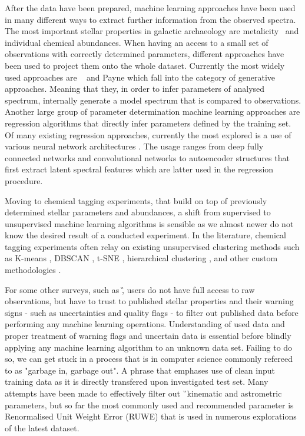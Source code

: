 After the data have been prepared, machine learning approaches have been used in many different ways to extract further information from the observed spectra. The most important stellar properties in galactic archaeology are metalicity \Feh\ and individual chemical abundances. When having an access to a small set of observations with correctly determined parameters, different approaches have been used to project them onto the whole dataset. Currently the most widely used approaches are \TC\ \cite{2015ApJ...808...16N, buder2018} and Payne \citep{2019ApJ...879...69T} which fall into the category of generative approaches. Meaning that they, in order to infer parameters of analysed spectrum, internally generate a model spectrum that is compared to observations. Another large group of parameter determination machine learning approaches are regression algorithms that directly infer parameters defined by the training set. Of many existing regression approaches, currently the most explored is a use of various neural network architectures \citep{2015MNRAS.452..158Y, 2019MNRAS.483.3255L, 2020ApJ...891...23W, 2020arXiv200208390O}. The usage ranges from deep fully connected networks and convolutional networks to autoencoder structures that first extract latent spectral features which are latter used in the regression procedure.

Moving to chemical tagging experiments, that build on top of previously determined stellar parameters and abundances, a shift from supervised to unsupervised machine learning algorithms is sensible as we almost newer do not know the desired result of a conducted experiment. In the literature, chemical tagging experiments often relay on existing unsupervised clustering methods such as K-means \cite{2015A&A...577A..47B, 2016ApJ...833..262H, 2018ApJ...860...70C}, DBSCAN \cite{2019MNRAS.487..871P}, t-SNE \cite{2018MNRAS.473.4612K, 2018A&A...619A.125A}, hierarchical clustering \cite{2017MNRAS.467.1140J, 2018A&A...618A..65B}, and other custom methodologies \cite{2019ApJ...887...73C}.

For some other surveys, such as \G, users do not have full access to raw observations, but have to trust to published stellar properties and their warning signs - such as uncertainties and quality flags - to filter out published data before performing any machine learning operations. Understanding of used data and proper treatment of warning flags and uncertain data is essential before blindly applying any machine learning algorithm to an unknown data set. Failing to do so, we can get stuck in a process that is in computer science commonly refereed to as "garbage in, garbage out". A phrase that emphases use of clean input training data as it is directly transfered upon investigated test set. Many attempts have been made to effectively filter out \G\ kinematic and astrometric parameters, but so far the most commonly used and recommended parameter is Renormalised Unit Weight Error (RUWE) \cite{ruwe} that is used in numerous explorations of the latest dataset. 

